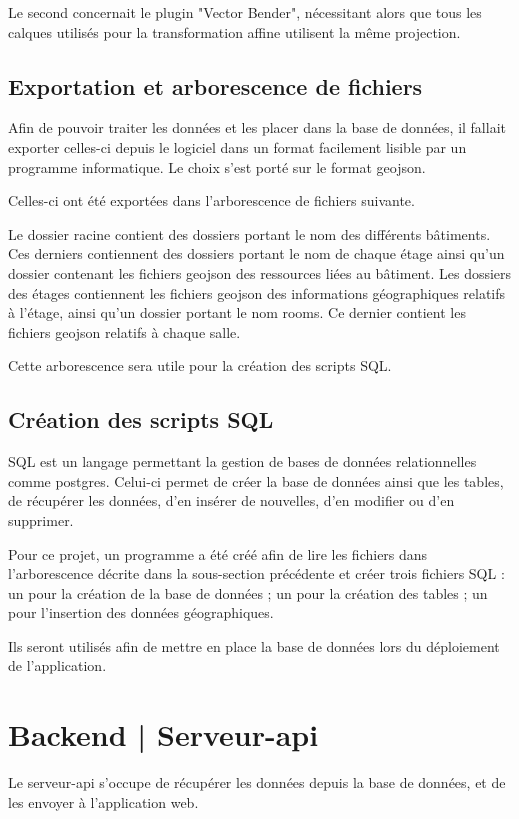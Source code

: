 \documentclass[
    iai, %
    il, %
]{heig-tb}
\begin{document}
Le second concernait le plugin "Vector Bender", nécessitant alors que tous les calques utilisés pour la transformation affine utilisent la même projection.

\subsection{Exportation et arborescence de fichiers}
Afin de pouvoir traiter les données et les placer dans la base de données,
il fallait exporter celles-ci depuis le logiciel dans un format facilement lisible par un programme informatique.
Le choix s'est porté sur le format \gls{geojson}.

Celles-ci ont été exportées dans l'arborescence de fichiers suivante.

Le dossier racine contient des dossiers portant le nom des différents bâtiments.
Ces derniers contiennent des dossiers portant le nom de chaque étage ainsi qu'un dossier contenant les fichiers \gls{geojson} des ressources liées au bâtiment.
Les dossiers des étages contiennent les fichiers \gls{geojson} des informations géographiques relatifs à l'étage, ainsi qu'un dossier portant le nom rooms.
Ce dernier contient les fichiers \gls{geojson} relatifs à chaque salle.

Cette arborescence sera utile pour la création des scripts SQL.

\subsection{Création des scripts SQL}
SQL est un langage permettant la gestion de bases de données relationnelles comme \gls{postgres}.
Celui-ci permet de créer la base de données ainsi que les tables, de récupérer les données, d'en insérer de nouvelles, d'en modifier ou d'en supprimer.

Pour ce projet, un programme  a été créé afin de lire les fichiers dans l'arborescence décrite dans la sous-section précédente
et créer trois fichiers SQL : un pour la création de la base de données ; un pour la création des tables ; un pour l'insertion des données géographiques.

Ils seront utilisés afin de mettre en place la base de données lors du déploiement de l'application.

\section{Backend | Serveur-api}
Le serveur-api s'occupe de récupérer les données depuis la base de données, et de les envoyer à l'application web.
\end{document}
